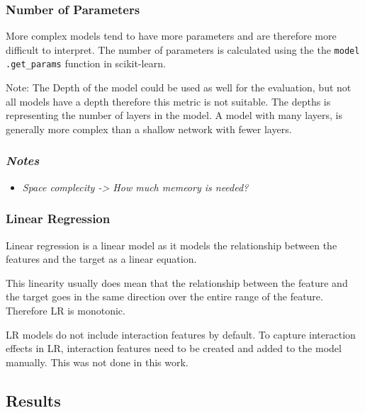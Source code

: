 \subsubsection*{Number of Parameters}
More complex models tend to have more parameters and are therefore more
difficult to interpret.
The number of parameters is calculated using the the \texttt{model
.get\_params} function
in scikit-learn.

Note: The Depth of the model could be used as well for the evaluation, but
not all models have a
depth therefore this metric is not suitable.
The depths is representing the number of layers in the model.
A model with many layers, is generally more complex than a shallow network
with fewer layers.

\subsubsection*{\textit{Notes}}

\begin{itemize}
    \item \textit{Space complecity -> How much memeory is needed?}
\end{itemize}

\subsubsection*{Linear Regression}
Linear regression is a linear model as it models the relationship between the
features and the
target as a linear equation.

This linearity usually does mean that the relationship between the feature
and the target goes in
the same direction over the entire range of the feature. Therefore \ac{LR} is
monotonic.

\ac{LR} models do not include interaction features by default.
To capture interaction effects in \ac{LR}, interaction features need to be
created and added to
the model manually. This was not done in this work.

\subsection{Results}\label{subsec:results2}

